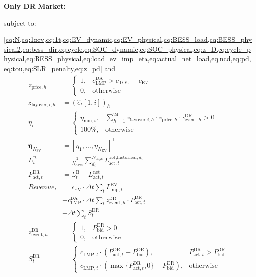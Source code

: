 \documentclass[conference]{IEEEtran}
\begin{document}
\textbf{Only DR Market:}

subject to: 

\cref{eq:N,eq:1nev,eq:1t,eq:EV_dynamic,eq:EV_physical,eq:BESS_load,eq:BESS_physical2,eq:bess_dir,eq:cycle,eq:SOC_dynamic,eq:SOC_physical,eq:z_D,eq:cycle_physical,eq:BESS_physical,eq:load_ev_imp_eta,eq:actual_net_load,eq:ncd,eq:pd,eq:tou,eq:SLR_penalty,eq:z_pd} and
\begin{align}
    z_{\text{price},h} &= 
    \begin{cases} 
        1, & c_{\text{LMP}}^{\text{DA}} > c_{\text{TOU}} - c_{\text{EV}} \\ 
        0, & \text{otherwise}
    \end{cases} \label{eq:z_price} \\
    z_{\text{layover},i,h} &= (\hat{e}_t \left[ 1,i \right])_h \label{eq:z_layover} \\
    \eta_i &= 
    \begin{cases} 
        \eta_{\text{min},i}, & \sum_{h=1}^{24} z_{\text{layover},i,h} \cdot z_{\text{price},h} \cdot z_{\text{event},h}^{\text{DR}} > 0 \\ 
        100\%, & \text{otherwise} 
    \end{cases} \label{eq:eta_i} \\
    \pmb{\eta}_{N_{\text{EV}}} &= \left [\eta_1, \ldots, \eta_{N_{\text{EV}}} \right ] ^\top \label{eq:eta_vector} \\
    L^{\text{B}}_{t} &= \frac{1}{N_{\text{days}}} \sum_{d_i}^{N_{\text{days}}} L^{\text{net,historical}, d_i}_{\text{act},t} \label{eq:baseline} \\
    P_{\text{act},t}^{\text{DR}} &= L^{\text{B}}_t - L^{\text{net}}_{\text{act},t} \label{eq:DR_capacity} \\
    Revenue_t &= c_{\text{EV}} \cdot \Delta t \sum_t L^{\text{EV}}_{\text{imp},t} \\
    &+ c_{\text{LMP}}^{\text{DA}} \cdot \Delta t \sum_t z_{\text{event},h}^{\text{DR}} \cdot P_{\text{act},t}^{\text{DR}} \label{eq:DR_DA_revenue} \\
    &+ \Delta t \sum_t S_t^{\text{DR}} \\
    z_{\text{event},h}^{\text{DR}} &=
    \begin{cases} 
        1, & P_{\text{bid}}^{\text{DR}} > 0 \\
        0, & \text{otherwise}
    \end{cases} \label{eq:DR_event_hour} \\
    S_t^{\text{DR}} &=
    \begin{cases} 
        c_{\text{LMP},t} \cdot (P_{\text{act},t}^{\text{DR}} - P_{\text{bid}}^{\text{DR}}), & P^{\text{DR}}_{\text{act},t} > P^{\text{DR}}_{\text{bid}} \\
        c_{\text{LMP},t} \cdot (\max \{ P_{\text{act},t}^{\text{DR}}, 0 \} - P_{\text{bid}}^{\text{DR}}), & \text{otherwise}
    \end{cases} \label{eq:DR_settlement} 
\end{align}
\end{document}
